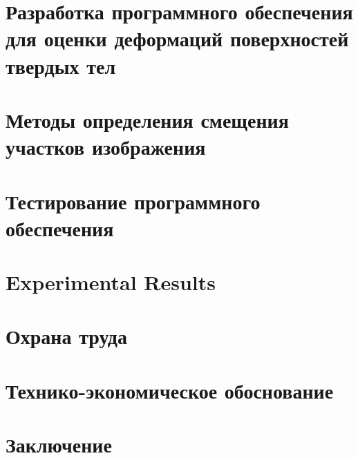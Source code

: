 




\newpage
{}
\renewcommand\contentsname{\hfill Содержание \hfill}
\tableofcontents

\section{Разработка программного обеспечения для оценки деформаций поверхностей твердых тел}

\section{Методы определения смещения участков изображения}

\newpage
\section{Тестирование программного обеспечения}

\section{Experimental Results}

\section{Охрана труда}

\section{Технико-экономическое обоснование}

\section{Заключение}

\newpage
\renewcommand{\refname}{Список использованных источников}


